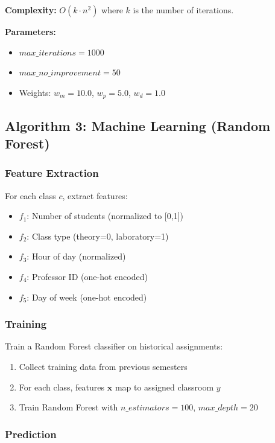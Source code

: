 \documentclass[algorithms,article,submit,pdftex,moreauthors]{Definitions/mdpi}
\begin{document}
\textbf{Complexity:} $O(k \cdot n^2)$ where $k$ is the number of iterations.

\textbf{Parameters:}
\begin{itemize}
\item $max\_iterations = 1000$
\item $max\_no\_improvement = 50$
\item Weights: $w_m=10.0$, $w_p=5.0$, $w_d=1.0$
\end{itemize}

\subsection{Algorithm 3: Machine Learning (Random Forest)}

\subsubsection{Feature Extraction}

For each class $c$, extract features:
\begin{itemize}
\item $f_1$: Number of students (normalized to [0,1])
\item $f_2$: Class type (theory=0, laboratory=1)
\item $f_3$: Hour of day (normalized)
\item $f_4$: Professor ID (one-hot encoded)
\item $f_5$: Day of week (one-hot encoded)
\end{itemize}

\subsubsection{Training}

Train a Random Forest classifier on historical assignments:
\begin{enumerate}
\item Collect training data from previous semesters
\item For each class, features $\mathbf{x}$ map to assigned classroom $y$
\item Train Random Forest with $n\_estimators=100$, $max\_depth=20$
\end{enumerate}

\subsubsection{Prediction}
\end{document}
